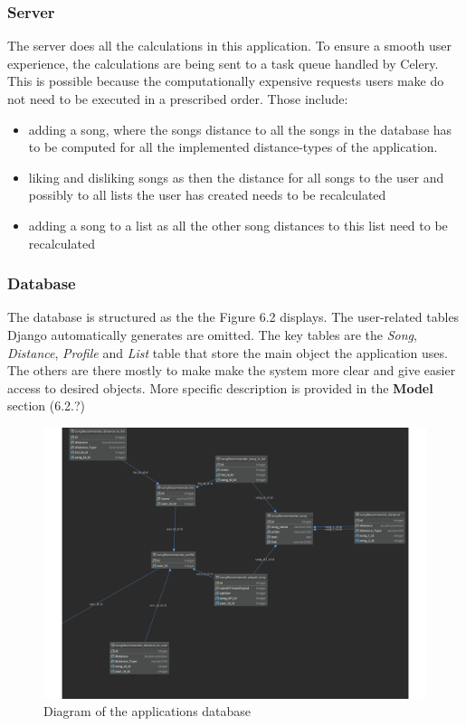 \subsubsection{Server}

The server does all the calculations in this application. To ensure a smooth user experience, the calculations are being sent to a task queue handled by Celery. This is possible because the computationally expensive requests users make do not need to be executed in a prescribed order. Those include:
\begin{itemize}
    \item adding a song, where the songs distance to all the songs in the database has to be computed for all the implemented distance-types of the application.
    \item liking and disliking songs as then the distance for all songs to the user and possibly to all lists the user has created needs to be recalculated
    \item adding a song to a list as all the other song distances to this list need to be recalculated
\end{itemize} 

\subsubsection{Database}

 The database is structured as the the Figure 6.2 displays. The user-related tables Django  automatically generates are omitted. The key tables are the \textit{Song}, \textit{Distance}, \textit{Profile} and \textit{List} table that store the main object the application uses. The others are there mostly to make make the system more clear and give easier access to desired objects. More specific description is provided in the \textbf{Model} section (6.2.?)
\begin{figure}[ht]
    \centering
	\includegraphics[width=120mm]{./img/database_diagram.pdf}
	\caption{Diagram of the applications database}
	\label{fig:diagram}
\end{figure}
 
